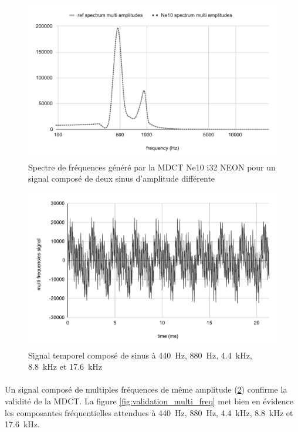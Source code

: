 \documentclass{article}
\begin{document}
    \begin{figure}[H]
        \centering
        \includegraphics[width=.8\linewidth]{./images/validation_ne10_i32_neon_multi_ampl.pdf}
        \caption{Spectre de fréquences généré par la MDCT Ne10 i32 NEON pour un signal composé de deux sinus d'amplitude différente}
        \label{fig:validation_ne10_i32_neon_multi_ampl}
    \end{figure}

    \begin{figure}[H]
        \centering
        \includegraphics[width=.8\linewidth]{./images/signal_multi_freq.pdf}
        \caption{Signal temporel composé de sinus à \SI{440}{\hertz}, \SI{880}{\hertz}, \SI{4.4}{\kilo\hertz}, \SI{8.8}{\kilo\hertz} et \SI{17.6}{\kilo\hertz}}
        \label{fig:signal_multi_freq}
    \end{figure}

    \paragraph{}
    Un signal composé de multiples fréquences de même amplitude (\ref{fig:signal_multi_freq}) confirme la validité de la MDCT. La figure \ref{fig:validation_multi_freq} met bien en évidence les composantes fréquentielles attendues à \SI{440}{\hertz}, \SI{880}{\hertz}, \SI{4.4}{\kilo\hertz}, \SI{8.8}{\kilo\hertz} et \SI{17.6}{\kilo\hertz}.
\end{document}
